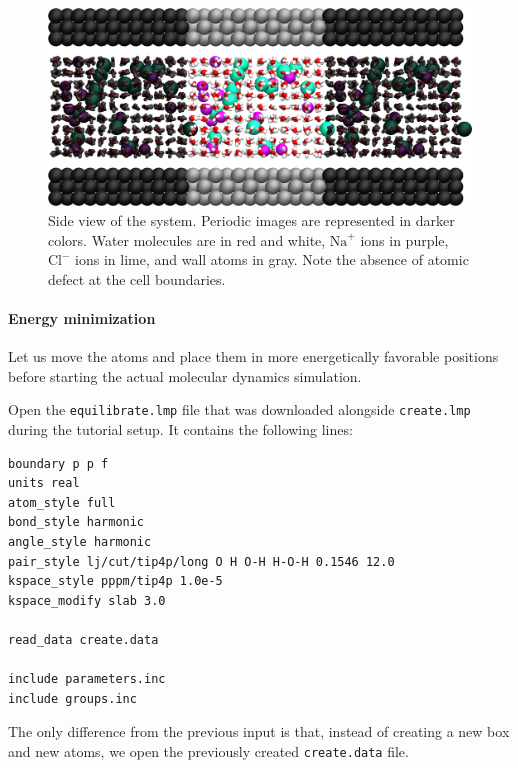 \documentclass[9pt,tutorial]{livecoms}
\newcommand{\flecmd}[1]{\textcolor{command}{\texttt{#1}}} %
\begin{document}
\begin{figure}
\centering
\includegraphics[width=\linewidth]{NANOSHEAR-system}
\caption{Side view of the system.  Periodic images are represented in darker colors.
Water molecules are in red and white, $\text{Na}^+$ ions in purple, $\text{Cl}^-$
ions in lime, and wall atoms in gray.  Note the absence of atomic defect at the
cell boundaries.}
\label{fig:NANOSHEAR-system}
\end{figure}

\paragraph{Energy minimization}

Let us move the atoms and place them in more energetically favorable positions
before starting the actual molecular dynamics simulation.

Open the \flecmd{equilibrate.lmp} file that was downloaded alongside
\flecmd{create.lmp} during the tutorial setup.  It contains the following lines:
\begin{lstlisting}
boundary p p f
units real
atom_style full
bond_style harmonic
angle_style harmonic
pair_style lj/cut/tip4p/long O H O-H H-O-H 0.1546 12.0
kspace_style pppm/tip4p 1.0e-5
kspace_modify slab 3.0

read_data create.data

include parameters.inc
include groups.inc
\end{lstlisting}
The only difference from the previous input is that, instead of creating a new
box and new atoms, we open the previously created \flecmd{create.data} file.
\end{document}
